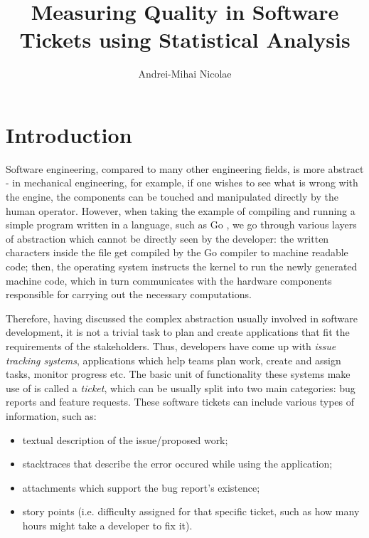 \documentclass[11pt,english,twocolumn]{article}
\begin{document}
\title{Measuring Quality in Software Tickets using Statistical Analysis}

\author{Andrei-Mihai Nicolae}
\date{}
\maketitle

\section{Introduction}
\label{sec:Introduction}

Software engineering, compared to many other engineering fields, is more
abstract \cite{brooks1995mythical} - in mechanical engineering, for example,
if one wishes to see what is wrong with the engine, the components can be 
touched and manipulated directly by the human operator. However, when taking the example of
compiling and running a simple program written in a language, such as Go 
\cite{golang}, we go through various layers of abstraction which cannot be directly 
seen by the developer: the written characters inside the file get compiled by the
Go compiler to machine readable code; then, the operating system instructs the 
kernel to run the newly generated machine code, which in turn communicates with 
the hardware components responsible for carrying out the necessary computations.

Therefore, having discussed the complex abstraction usually involved in software development,
it is not a trivial task to plan and create applications that fit the requirements of the
stakeholders. Thus, developers have come up with \emph{issue tracking systems}, applications
which help teams plan work, create and assign tasks, monitor progress etc. The basic unit of
functionality these systems make use of is called a \emph{ticket}, which can be usually split
into two main categories: bug reports and feature requests. These software tickets can include 
various types of information, such as:
\begin{itemize}
	\item textual description of the issue/proposed work;
	\item stacktraces that describe the error occured while using the application;
	\item attachments which support the bug report's existence;
	\item story points (i.e. difficulty assigned for that specific ticket, such as 
	how many hours might take a developer to fix it).
\end{itemize}
\end{document}
